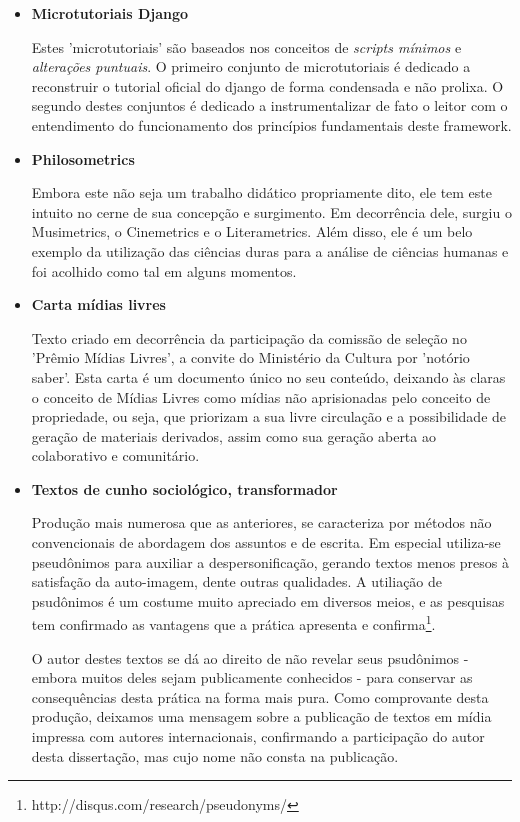 \begin{itemize}
    \item {\bf Microtutoriais Django ~\cite{dmicrotuts}}

Estes 'microtutoriais' são baseados nos conceitos de \emph{scripts mínimos} e
\emph{alterações puntuais}. O primeiro conjunto de microtutoriais é dedicado
a reconstruir o tutorial oficial do django de forma condensada e não prolixa.
O segundo destes conjuntos é dedicado a instrumentalizar de fato o leitor com
o entendimento do funcionamento dos princípios fundamentais deste framework.

    \item {\bf Philosometrics}

Embora este não seja um trabalho didático propriamente dito, ele tem este intuito
no cerne de sua concepção e surgimento. Em decorrência dele, surgiu o  Musimetrics,
o Cinemetrics e o Literametrics. Além disso, ele é um belo exemplo da
utilização das ciências duras para a análise de ciências humanas e foi acolhido
como tal em alguns momentos.

    \item {\bf Carta mídias livres}

Texto criado em decorrência da participação da comissão de seleção no
'Prêmio Mídias Livres', a convite do Ministério da Cultura por 'notório saber'.
Esta carta é um documento único no seu conteúdo, deixando às claras
o conceito de Mídias Livres como mídias não aprisionadas pelo conceito
de propriedade, ou seja, que priorizam a sua livre circulação e a possibilidade
de geração de materiais derivados, assim como sua geração aberta ao colaborativo e comunitário.

    \item {\bf Textos de cunho sociológico, transformador}

Produção mais numerosa que as anteriores, se caracteriza por métodos não convencionais
de abordagem dos assuntos e de escrita. Em especial utiliza-se pseudônimos para
auxiliar a despersonificação, gerando textos menos presos à satisfação da auto-imagem, dente
outras qualidades. A utiliação de psudônimos é um costume muito apreciado em diversos meios,
e as pesquisas tem confirmado as vantagens que a prática apresenta e confirma\footnote{http://disqus.com/research/pseudonyms/}.

O autor destes textos se dá ao direito de não revelar seus psudônimos - embora muitos deles
sejam publicamente conhecidos - para conservar as consequências desta prática na
forma mais pura. Como comprovante desta produção, deixamos uma mensagem sobre a publicação
de textos em mídia impressa com autores internacionais,
confirmando a participação do autor desta dissertação, mas cujo
nome não consta na publicação.


\end{itemize}
